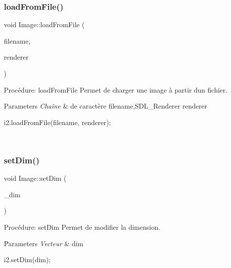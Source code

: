 \subsubsection{\texorpdfstring{load\+From\+File()}{loadFromFile()}}
{\footnotesize\ttfamily void Image\+::load\+From\+File (\begin{DoxyParamCaption}\item[{const char $\ast$}]{filename,  }\item[{S\+D\+L\+\_\+\+Renderer $\ast$}]{renderer }\end{DoxyParamCaption})}



Procédure\+: load\+From\+File Permet de charger une image à partir d\textquotesingle{}un fichier. 


\begin{DoxyParams}{Parameters}
{\em Chaîne} & de caractère filename,S\+D\+L\+\_\+\+Renderer renderer 
\begin{DoxyCode}
i2.loadFromFile(filename, renderer);
\end{DoxyCode}
 \\
\hline
\end{DoxyParams}
\mbox{\label{classImage_a9561b601b84ece813a9b87b881b8fc24}} 
\subsubsection{\texorpdfstring{set\+Dim()}{setDim()}}
{\footnotesize\ttfamily void Image\+::set\+Dim (\begin{DoxyParamCaption}\item[{const Vec \&}]{\+\_\+dim }\end{DoxyParamCaption})}



Procédure\+: set\+Dim Permet de modifier la dimension. 


\begin{DoxyParams}{Parameters}
{\em Vecteur} & dim 
\begin{DoxyCode}
i2.setDim(dim);
\end{DoxyCode}
 \\
\hline
\end{DoxyParams}
\mbox{\label{classImage_a833f5d3b4b9f905320c6dffcc9b84b95}} 

